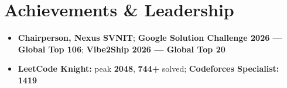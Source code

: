 \documentclass[a4paper,10pt]{article}
\begin{document}
\section{Achievements \& Leadership}
\begin{itemize}
  \item \textbf{Chairperson, Nexus SVNIT}; \textbf{Google Solution Challenge 2026 --- Global Top 106}; \textbf{Vibe2Ship 2026 --- Global Top 20}
  \item \textbf{LeetCode Knight:} peak \textbf{2048}, \textbf{744+} solved; \textbf{Codeforces Specialist:} \textbf{1419}
\end{itemize}
\end{document}
